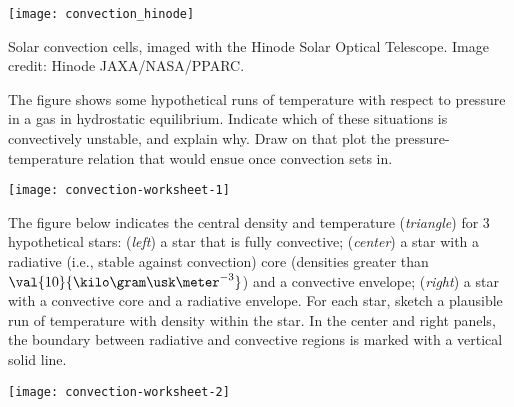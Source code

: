 \begin{marginfigure}
\texttt{[image: convection\_hinode]}
\caption{\label{f.solar-convection]} Solar convection cells, imaged with the Hinode Solar Optical Telescope. Image credit: Hinode JAXA/NASA/PPARC.}
\end{marginfigure}

\begin{exercisebox}
The figure shows some hypothetical runs of temperature with respect to pressure in a gas in hydrostatic equilibrium.  Indicate which of these situations is convectively unstable, and explain why. Draw on that plot the pressure-temperature relation that would ensue once convection sets in.

\texttt{[image: convection-worksheet-1]}
\end{exercisebox}

\begin{exercisebox}
The figure below indicates the central density and temperature (\emph{triangle}) for 3 hypothetical stars: (\emph{left}) a star that is fully convective; (\emph{center}) a star with a radiative (i.e., stable against convection) core (densities greater than $\val{10}{\kilo\gram\usk\meter^{-3}}$) and a convective envelope; (\emph{right}) a star with a convective core and a radiative envelope.  For each star, sketch a plausible run of temperature with density within the star. In the center and right panels, the boundary between radiative and convective regions is marked with a vertical solid line.

\texttt{[image: convection-worksheet-2]}
\end{exercisebox}


